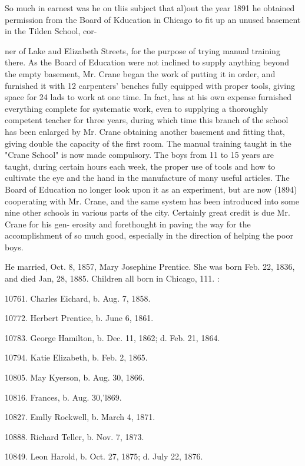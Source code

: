 So much in earnest was he on tliis subject that al)out the year 
1891 he obtained permission from the Board of Kducation in 
Chicago to fit up an unused basement in the Tilden School, cor- 




ner of Lake aud Elizabeth Streets, for the purpose of trying 
manual training there. As the Board of Education were not 
inclined to supply anything beyond the empty basement, Mr. 
Crane began the work of putting it in order, and furnished it 
with 12 carpenters' benches fully equipped with proper tools, 
giving space for 24 lads to work at one time. In fact, has at his 
own expense furnished everything complete for systematic work, 
even to supplying a thoroughly competent teacher for three years, 
during which time this branch of the school has been enlarged by 
Mr. Crane obtaining another basement and fitting that, giving 
double the capacity of the first room. The manual training 
taught in the "Crane School" is now made compulsory. The 
boys from 11 to 15 years are taught, during certain hours each 
week, the proper use of tools and how to cultivate the eye and 
the hand in the manufacture of many useful articles. The Board 
of Education no longer look upon it as an experiment, but are 
now (1894) cooperating with Mr. Crane, and the same system 
has been introduced into some nine other schools in various parts 
of the city. Certainly great credit is due Mr. Crane for his gen- 
erosity and forethought in paving the way for the accomplishment 
of so much good, especially in the direction of helping the poor 
boys. 

He married, Oct. 8, 1857, Mary Josephine Prentice. She was 
born Feb. 22, 1836, and died Jan, 28, 1885. Children all born 
in Chicago, 111. : 

10761. Charles Eichard, b. Aug. 7, 1858. 

10772. Herbert Prentice, b. June 6, 1861. 

10783. George Hamilton, b. Dec. 11, 1862; d. Feb. 21, 1864. 

10794. Katie Elizabeth, b. Feb. 2, 1865. 

10805. May Kyerson, b. Aug. 30, 1866. 

10816. Frances, b. Aug. 30,'l869. 

10827. Emlly Rockwell, b. March 4, 1871. 

10888. Richard Teller, b. Nov. 7, 1873. 

10849. Leon Harold, b. Oct. 27, 1875; d. July 22, 1876. 


